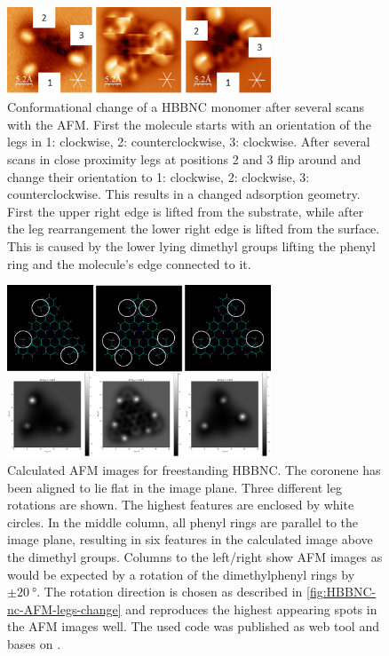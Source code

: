 \begin{figure}[] \centering
	\includegraphics[width=0.7\textwidth]{./images/hbbnc-ag-111-leg-flip}
	\caption{Conformational change of a HBBNC monomer after several scans with the AFM. First the molecule starts with an orientation of the legs in 1: clockwise, 2: counterclockwise, 3: clockwise. After several scans in close proximity legs at positions 2 and 3 flip around and change their orientation to 1: clockwise, 2: clockwise, 3: counterclockwise. This results in a changed adsorption geometry. First the upper right edge is lifted from the substrate, while after the leg rearrangement the lower right edge is lifted from the surface. This is caused by the lower lying dimethyl groups lifting the phenyl ring and the molecule's edge connected to it.}
	\label{fig:HBBNC-nc-AFM-legs-change}
\end{figure}

\begin{figure}[] \centering
	\includegraphics[width=0.7\textwidth]{./images/Simulated-AFM-flipping-legs}
	\caption{Calculated AFM images for freestanding HBBNC. The coronene has been aligned to lie flat in the image plane. Three different leg rotations are shown. The highest features are enclosed by white circles. In the middle column, all phenyl rings are parallel to  the image plane, resulting in six features in the calculated image above the dimethyl groups. Columns to the left/right show AFM images as would be expected by a rotation of the dimethylphenyl rings by $\pm \SI{20}{\degree}$. The rotation direction is chosen as described in \autoref{fig:HBBNC-nc-AFM-legs-change} and reproduces the highest appearing spots in the AFM images well. The used code was published as web tool \cite{_AFM_calc} and bases on  \cite{hapala_origin_2014,hapala_mechanism_2014}.}
	\label{fig:HBBNC-nc-AFM-legs-change-calc}
\end{figure}


